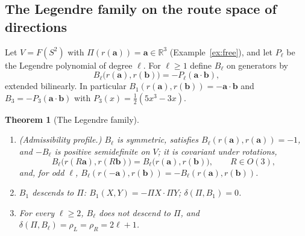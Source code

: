 \documentclass[11pt,a4paper]{article}
\newcommand{\RR}{\mathbb{R}}
\newcommand{\defic}{\delta}
\theoremstyle{plain}
\newtheorem{theorem}{Theorem}[section]
\theoremstyle{definition}
\begin{document}
\subsection{The Legendre family on the route space of directions}\label{sec:legendre}
Let $V=F(S^2)$ with $\Pi(r(\mathbf a))=\mathbf a\in\RR^3$ (Example~\ref{ex:free}), and let $P_\ell$ be the Legendre polynomial of degree $\ell$. For $\ell\ge1$ define $B_\ell$ on generators by
\begin{equation}\label{eq:Bell}
B_\ell\bigl(r(\mathbf a),r(\mathbf b)\bigr)=-P_\ell(\mathbf a\cdot\mathbf b),
\end{equation}
extended bilinearly. In particular $B_1(r(\mathbf a),r(\mathbf b))=-\mathbf a\cdot\mathbf b$ and $B_3=-P_3(\mathbf a\cdot\mathbf b)$ with $P_3(x)=\tfrac12(5x^3-3x)$.

\begin{theorem}[The Legendre family]\label{thm:legendre}
\begin{enumerate}[label=(\roman*)]
\item (Admissibility profile.) $B_\ell$ is symmetric, satisfies $B_\ell(r(\mathbf a),r(\mathbf a))=-1$, and $-B_\ell$ is positive semidefinite on $V$; it is covariant under rotations,
\[ B_\ell\bigl(r(R\mathbf a),r(R\mathbf b)\bigr)=B_\ell\bigl(r(\mathbf a),r(\mathbf b)\bigr),\qquad R\in O(3), \]
and, for odd $\ell$, $B_\ell(r(-\mathbf a),r(\mathbf b))=-B_\ell(r(\mathbf a),r(\mathbf b))$.
\item $B_1$ descends to $\Pi$: $B_1(X,Y)=-\Pi X\cdot\Pi Y$; $\defic(\Pi,B_1)=0$.
\item For every $\ell\ge2$, $B_\ell$ does not descend to $\Pi$, and $\defic(\Pi,B_\ell)=\rho_L=\rho_R=2\ell+1$.
\end{enumerate}
\end{theorem}
\end{document}
